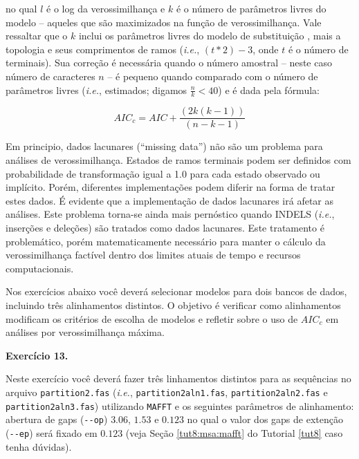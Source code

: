 \begin{refsection}
no qual $l$ é o log da verossimilhança e $k$ é o número de parâmetros livres do modelo -- aqueles que são maximizados na função de verossimilhança. Vale ressaltar que o $k$ inclui os parâmetros livres do modelo de substituição \parencite[veja Tabela 1 de][]{Darriba_and_Posada_2015}, mais a topologia e seus comprimentos de ramos (\textit{i.e.}, $(t * 2)-3$, onde $t$ é o número de terminais). Sua correção é necessária quando o número amostral -- neste caso número de caracteres $n$ -- é pequeno quando comparado com o número de parâmetros livres (\textit{i.e.}, estimados; digamos $\frac{n}{k} < 40$) e é dada pela fórmula:

\begin{center}
\begin{equation}\label{tut12:first_sec:model_aicc}
AIC_{c} = AIC + \frac{(2k(k-1))}{(n-k-1)}
\end{equation}
\end{center}

Em principio, dados lacunares (``missing data'') não são um problema para análises de verossimilhança. Estados de ramos terminais podem ser definidos com probabilidade de transformação igual a 1.0 para cada estado observado ou implícito. Porém, diferentes implementações podem diferir na forma de tratar estes dados. É evidente que a implementação de dados lacunares irá afetar as análises. Este problema torna-se ainda mais pernóstico quando INDELS (\textit{i.e.}, inserções e deleções) são tratados como dados lacunares. Este tratamento é problemático, porém matematicamente necessário para manter o cálculo da verossimilhança factível dentro dos limites atuais de tempo e recursos computacionais.

Nos exercícios abaixo você deverá selecionar modelos para dois bancos de dados, incluindo três alinhamentos distintos. O objetivo é verificar como alinhamentos modificam os critérios de escolha de modelos e refletir sobre o uso de $AIC_{c}$ em análises por verossimilhança máxima.\\


\begin{blackBlock}{\textbf{Exercício 13.}}\label{tut12:ex:13.5}

Neste exercício você deverá fazer três linhamentos distintos para as sequências no arquivo \texttt{partition2.fas} (\textit{i.e.}, \texttt{partition2aln1.fas}, \texttt{partition2aln2.fas} e \texttt{partition2aln3.fas}) utilizando \texttt{MAFFT} e os seguintes parâmetros de alinhamento: abertura de gaps (\texttt{{-}{-}op})  $3.06$, $1.53$ e $0.123$ no qual o valor dos gaps de extenção (\texttt{{-}{-}ep})  será fixado em $0.123$ (veja Seção \ref{tut8:msa:mafft} do Tutorial \ref{tut8} caso tenha dúvidas).


\end{blackBlock}
\end{refsection}
